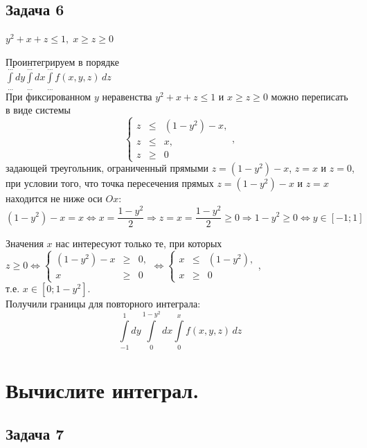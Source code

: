 \documentclass[a4paper, fleqn]{article}
\begin{document}
    \subsection*{Задача 6}
    
    $y^2 + x + z \le 1, \; x \ge z \ge 0$
    
    Проинтегрируем в порядке \\[3 pt]
    $\int\limits_{\dots}^{\dots} dy \int\limits_{\dots}^{\dots} dx \int\limits_{\dots}^{\dots} f(x, y, z)\, dz$ \\
    
    При фиксированном $y$ неравенства $y^2 + x + z \le 1$ и $x \ge z \ge 0$ можно переписать в виде системы
    \[ \left\{\begin{array}{rcl} z &\le& (1-y^2) - x, \\ z &\le& x, \\ z &\ge& 0 \end{array}\right., \]
    задающей треугольник, ограниченный прямыми $z = (1-y^2)-x$, $z = x$ и $z = 0$, при условии того, что точка пересечения прямых $z = (1-y^2)-x$ и $z = x$ находится не ниже оси $Ox$:
    \[ (1-y^2)-x = x \Leftrightarrow x = \frac{1-y^2}2 \Rightarrow z = x = \frac{1-y^2}2 \ge 0 \Rightarrow 1-y^2 \ge 0 \Leftrightarrow y \in [-1; 1] \]
    
    Значения $x$ нас интересуют только те, при которых $z \ge 0 \Leftrightarrow \left\{\begin{array}{rcl} (1-y^2)-x &\ge& 0, \\ x &\ge& 0 \end{array}\right. \Leftrightarrow \left\{\begin{array}{rcl} x &\le& (1-y^2), \\ x &\ge& 0 \end{array}\right.$, \\[3 pt]
    т.е. $x \in [0; 1-y^2]$. \\
    
    Получили границы для повторного интеграла:
    \[ \int\limits_{-1}^{1} dy \int\limits_{0}^{1-y^2} dx \int\limits_{0}^{x} f(x, y, z)\, dz \]
    
    \section*{Вычислите интеграл.}
    \subsection*{Задача 7} 
    
\end{document}

